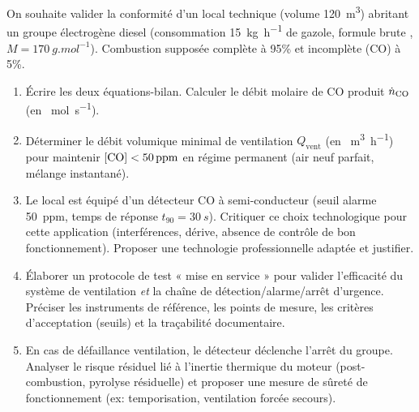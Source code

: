 \documentclass[11pt]{article}
\begin{document}
\begin{exercice}
On souhaite valider la conformité d'un local technique (volume \SI{120}{m^3}) abritant un groupe électrogène diesel (consommation \SI{15}{kg.h^{-1}} de gazole, formule brute , $M = \SI{170}{g.mol^{-1}}$). Combustion supposée complète à 95\% et incomplète (CO) à 5\%.
\begin{enumerate}
    \item Écrire les deux équations-bilan. Calculer le débit molaire de CO produit $\dot{n}_{\ce{CO}}$ (en \SI{}{mol.s^{-1}}).
    \item Déterminer le débit volumique minimal de ventilation $Q_{\text{vent}}$ (en \SI{}{m^3.h^{-1}}) pour maintenir $[\ce{CO}] < \SI{50}{ppm}$ en régime permanent (air neuf parfait, mélange instantané).
    \item Le local est équipé d'un détecteur CO à semi-conducteur (seuil alarme \SI{50}{ppm}, temps de réponse $t_{90} = \SI{30}{s}$). Critiquer ce choix technologique pour cette application (interférences, dérive, absence de contrôle de bon fonctionnement). Proposer une technologie professionnelle adaptée et justifier.
    \item Élaborer un protocole de test « mise en service » pour valider l'efficacité du système de ventilation \textit{et} la chaîne de détection/alarme/arrêt d'urgence. Préciser les instruments de référence, les points de mesure, les critères d'acceptation (seuils) et la traçabilité documentaire.
    \item En cas de défaillance ventilation, le détecteur déclenche l'arrêt du groupe. Analyser le risque résiduel lié à l'inertie thermique du moteur (post-combustion, pyrolyse résiduelle) et proposer une mesure de sûreté de fonctionnement (ex: temporisation, ventilation forcée secours).
\end{enumerate}
\end{exercice}
\end{document}
